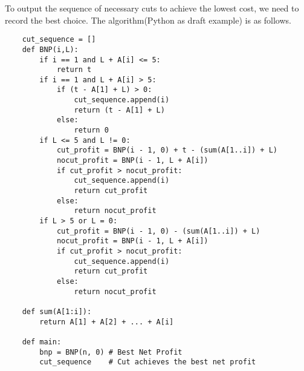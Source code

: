 \documentclass[12pt,a4paper]{article}
\newcommand{\question}[1]{\bigskip\noindent{\textbf{Q{#1} solution}}}
\begin{document}
\question{18.C}

To output the sequence of necessary cuts to achieve the lowest cost, we need to record the best choice. The algorithm(Python as draft example) is as follows.

\begin{lstlisting}
	cut_sequence = []
	def BNP(i,L):
		if i == 1 and L + A[i] <= 5:
			return t
		if i == 1 and L + A[i] > 5:
			if (t - A[1] + L) > 0:
				cut_sequence.append(i)
				return (t - A[1] + L)
			else:
				return 0
		if L <= 5 and L != 0:
			cut_profit = BNP(i - 1, 0) + t - (sum(A[1..i]) + L)
			nocut_profit = BNP(i - 1, L + A[i])
			if cut_profit > nocut_profit:
				cut_sequence.append(i)
				return cut_profit
			else:
				return nocut_profit
		if L > 5 or L = 0:
			cut_profit = BNP(i - 1, 0) - (sum(A[1..i]) + L)
			nocut_profit = BNP(i - 1, L + A[i])
			if cut_profit > nocut_profit:
				cut_sequence.append(i)
				return cut_profit
			else:
				return nocut_profit
	
	def sum(A[1:i]):
		return A[1] + A[2] + ... + A[i]

	def main:
		bnp = BNP(n, 0) # Best Net Profit
		cut_sequence 	# Cut achieves the best net profit
\end{lstlisting}
\end{document}
